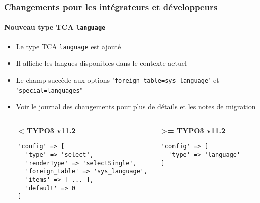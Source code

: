 %

\begin{frame}[fragile]
	\frametitle{Changements pour les intégrateurs et développeurs}
	\framesubtitle{Nouveau type TCA \texttt{language}}


	\begin{itemize}
		\item Le type TCA \texttt{language} est ajouté
		\item Il affiche les langues disponibles dans le contexte actuel
		\item Le champ succède aux options\newline
			"\texttt{foreign\_table=sys\_language}"
			et
			"\texttt{special=languages}"
		\item Voir le
			\href{https://docs.typo3.org/c/typo3/cms-core/master/en-us/Changelog/master/Feature-57082-NewTCATypeLanguage.html}{journal des changements}
			pour plus de détails et les notes de migration
	\end{itemize}


	\vspace{0.2cm}
	\begin{columns}[T]
			\begin{column}{.1\textwidth}
			\end{column}
			\begin{column}{.4\textwidth}
			\smaller\textbf{< TYPO3 v11.2}\normalsize
\begin{lstlisting}
'config' => [
  'type' => 'select',
  'renderType' => 'selectSingle',
  'foreign_table' => 'sys_language',
  'items' => [ ... ],
  'default' => 0
]
\end{lstlisting}
			\end{column}
			\begin{column}{.4\textwidth}
			\smaller\textbf{>= TYPO3 v11.2}\normalsize
\begin{lstlisting}
'config' => [
  'type' => 'language'
]
\end{lstlisting}
			\end{column}
			\begin{column}{.1\textwidth}
			\end{column}
	\end{columns}

\end{frame}


